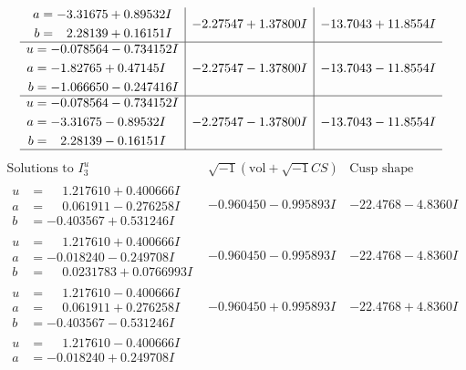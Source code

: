 \documentclass[1p]{elsarticle_modified}
\theoremstyle{definition}
\newcommand{\I}{\sqrt{-1}}
\begin{document}
$$\begin{array}{c|c|c}
\begin{aligned}
a &= -3.31675 + 0.89532 I \\
b &= \phantom{-}2.28139 + 0.16151 I\end{aligned}
 & -2.27547 + 1.37800 I & -13.7043 + 11.8554 I \\ \hline\begin{aligned}
u &= -0.078564 - 0.734152 I \\
a &= -1.82765 + 0.47145 I \\
b &= -1.066650 - 0.247416 I\end{aligned}
 & -2.27547 - 1.37800 I & -13.7043 - 11.8554 I \\ \hline\begin{aligned}
u &= -0.078564 - 0.734152 I \\
a &= -3.31675 - 0.89532 I \\
b &= \phantom{-}2.28139 - 0.16151 I\end{aligned}
 & -2.27547 - 1.37800 I & -13.7043 - 11.8554 I\\
 \hline 
 \end{array}$$\newpage$$\begin{array}{c|c|c}  
\text{Solutions to }I^u_{3}& \I (\text{vol} + \sqrt{-1}CS) & \text{Cusp shape}\\
 \hline 
\begin{aligned}
u &= \phantom{-}1.217610 + 0.400666 I \\
a &= \phantom{-}0.061911 - 0.276258 I \\
b &= -0.403567 + 0.531246 I\end{aligned}
 & -0.960450 - 0.995893 I & -22.4768 - 4.8360 I \\ \hline\begin{aligned}
u &= \phantom{-}1.217610 + 0.400666 I \\
a &= -0.018240 - 0.249708 I \\
b &= \phantom{-}0.0231783 + 0.0766993 I\end{aligned}
 & -0.960450 - 0.995893 I & -22.4768 - 4.8360 I \\ \hline\begin{aligned}
u &= \phantom{-}1.217610 - 0.400666 I \\
a &= \phantom{-}0.061911 + 0.276258 I \\
b &= -0.403567 - 0.531246 I\end{aligned}
 & -0.960450 + 0.995893 I & -22.4768 + 4.8360 I \\ \hline\begin{aligned}
u &= \phantom{-}1.217610 - 0.400666 I \\
a &= -0.018240 + 0.249708 I \\

\end{aligned}
\end{array}$$
\end{document}
